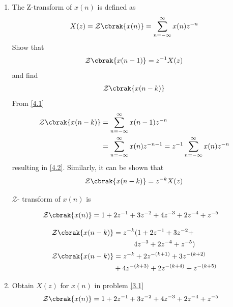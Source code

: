 \documentclass[journal,12pt,twocolumn]{IEEEtran}
\renewcommand\thesection{\arabic{section}}
\begin{document}
\begin{enumerate}[label=\thesection.\arabic*
,ref=\thesection.\theenumi]
\item The Z-transform of $x(n)$ is defined as 
\begin{align}\label{4.1}
	X(z) = \mathcal{Z}\cbrak{x(n)} = \sum_{n=-\infty}^\infty x(n) z^{-n}
\end{align}
Show that
\begin{align}\label{4.2}
	\mathcal{Z}\cbrak{x(n-1)} = z^{-1}X(z)
\end{align}
and find
\begin{align}
	\mathcal{Z}\cbrak{x(n-k)}
\end{align}
\solution From \eqref{4.1}
\begin{align}
	\mathcal{Z}\cbrak{x(n-k)} &= \sum_{n=-\infty}^\infty x(n-1)z^{-n}\\
	&= \sum_{n=-\infty}^\infty x(n)z^{-n-1}= z^{-1}\sum_{n=-\infty}^\infty x(n)z^{-n}
\end{align}
resulting in \eqref{4.2}. Similarly, it can be shown that 
\begin{align}\label{4.6}
	\mathcal{Z}\cbrak{x(n-k)} = z^{-k}X(z)
\end{align}

$\mathcal{Z}$- transform of $x(n)$ is 

\begin{align}
\mathcal{Z}\cbrak{x(n)} &= 1+2 z^{-1}+3 z^{-2} + 4 z^{-3} + 2 z^{-4} + z^{-5}
\end{align}

\begin{align}
\mathcal{Z}\cbrak{x(n-k)} &= z^{-k}(1+2 z^{-1}+3 z^{-2} +\\&\hspace*{10mm} 4 z^{-3} + 2 z^{-4} + z^{-5})\\
\mathcal{Z}\cbrak{x(n-k)} &= z^{-k}+2 z^{-(k+1)}+3 z^{-(k+2)} \\&+ 4 z^{-(k+3)} + 2 z^{-(k+4)} + z^{-(k+5)}
\end{align}

\item Obtain $X(z)$ for $x(n)$ in problem \eqref{3.1}\\
\solution \begin{align}
	\mathcal{Z}\cbrak{x(n)} &= 1+2 z^{-1}+3 z^{-2} + 4 z^{-3} + 2 z^{-4} + z^{-5}
	\end{align}
	

\end{enumerate}
\end{document}
